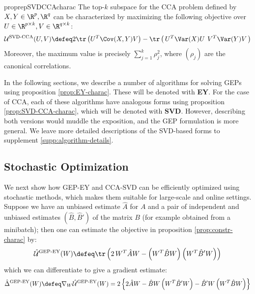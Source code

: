 \begin{restatable}{proprep}{SVDCCAcharac}
\label{prop:SVD-CCA-charac}
    The top-$k$ subspace for the CCA problem defined by $X,Y \in \R^p,\R^q$ can be characterized by maximizing the following objective over $U \in \R^{p \times k}, V \in \R^{q \times k}$:
    \begin{align}\label{eq:EY-charac}
        \mathcal{U}^\text{SVD-CCA}(U,V) 
        \defeq 2 \tr\left({U}^T \Cov(X,Y) {V} \right) - \tr\left(\, {U}^T \Var(X) {U} \:\, {V}^T \Var(Y) {V} \,\right)
    \end{align}
    Moreover, the maximum value is precisely $\sum_{j=1}^k \rho_j^2$, where $(\rho_j)$ are the canonical correlations.
\end{restatable}

In the following sections, we describe a number of algorithms for solving GEPs using proposition \ref{prop:EY-charac}.
These will be denoted with \textbf{EY}. For the case of CCA, each of these algorithms have analogous forms using proposition \ref{prop:SVD-CCA-charac}, which will be denoted with \textbf{SVD}. However, describing both versions would muddle the exposition, and the GEP formulation is more general. We leave more detailed descriptions of the SVD-based forms to supplement \ref{supp:algorithm-details}.

\subsection{Stochastic Optimization}

We next show how GEP-EY and CCA-SVD can be efficiently optimized using stochastic methods, which makes them suitable for large-scale and online settings.
Suppose we have an unbiased estimate $\hat{A}$ for $A$ and a pair of independent and unbiased estimates $(\hat{B},\hat{B}')$ of the matrix $B$ (for example obtained from a minibatch); then one can estimate the objective in proposition \ref{prop:constr-charac} by:
\begin{align}
    \hat{\mathcal{U}}^\text{GEP-EY}(W) \defeq \tr \left( 2\, W^T \hat{A} W - \left(W^T \hat{B} W\right) \left(W^T \hat{B}' W\right) \right)
\end{align}
which we can differentiate to give a gradient estimate:
\begin{align}\label{eq:GEP-EY-grad}
    \hat{\Delta}^{\text{GEP-EY}}(W)
    \defeq \nabla_W \hat{\mathcal{U}}^\text{GEP-EY}(W)
    = 2 \left\{ 2 \hat{A} W - \hat{B} W \left(W^T \hat{B}' W \right) - \hat{B}' W \left(W^T \hat{B} W \right) \right\}
\end{align}

